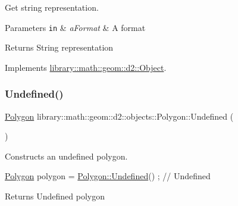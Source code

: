 Get string representation. 


\begin{DoxyParams}[1]{Parameters}
\mbox{\tt in}  & {\em a\+Format} & A format \\
\hline
\end{DoxyParams}
\begin{DoxyReturn}{Returns}
String representation 
\end{DoxyReturn}


Implements \hyperlink{classlibrary_1_1math_1_1geom_1_1d2_1_1_object_acdd76b3637732a249536b609dbe3f0eb}{library\+::math\+::geom\+::d2\+::\+Object}.

\mbox{\label{classlibrary_1_1math_1_1geom_1_1d2_1_1objects_1_1_polygon_a86e2c184f51c1e93fce5a786457b9fc3}} 
\subsubsection{\texorpdfstring{Undefined()}{Undefined()}}
{\footnotesize\ttfamily \hyperlink{classlibrary_1_1math_1_1geom_1_1d2_1_1objects_1_1_polygon}{Polygon} library\+::math\+::geom\+::d2\+::objects\+::\+Polygon\+::\+Undefined (\begin{DoxyParamCaption}{ }\end{DoxyParamCaption})\hspace{0.3cm}{\ttfamily [static]}}



Constructs an undefined polygon. 


\begin{DoxyCode}
\hyperlink{classlibrary_1_1math_1_1geom_1_1d2_1_1objects_1_1_polygon_ad2a0b0bcd5301dbcd9e2fa101fbd220b}{Polygon} polygon = \hyperlink{classlibrary_1_1math_1_1geom_1_1d2_1_1objects_1_1_polygon_a86e2c184f51c1e93fce5a786457b9fc3}{Polygon::Undefined}() ; \textcolor{comment}{// Undefined}
\end{DoxyCode}


\begin{DoxyReturn}{Returns}
Undefined polygon 
\end{DoxyReturn}
\mbox{\label{classlibrary_1_1math_1_1geom_1_1d2_1_1objects_1_1_polygon_a813f6b937bddcefd06701200adbb8a5f}} 
